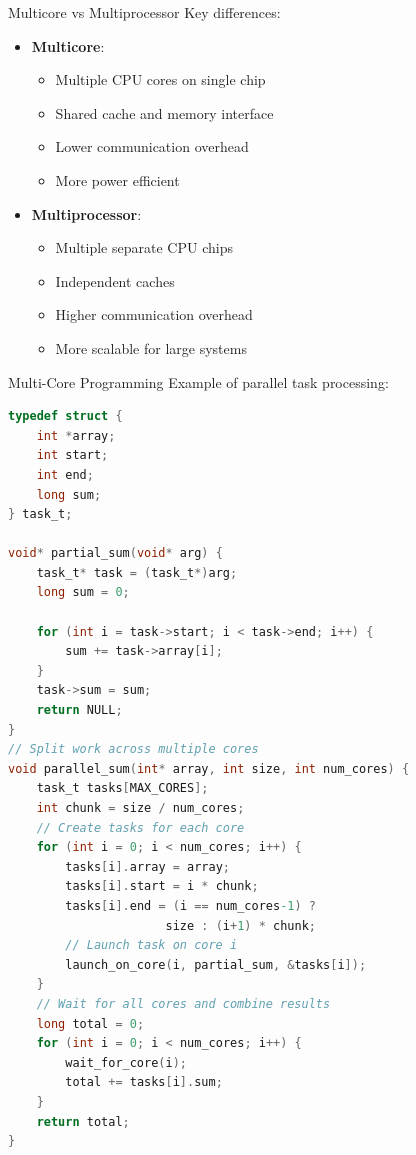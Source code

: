 \begin{example2}{Multicore vs Multiprocessor}
Key differences:
\begin{itemize}
  \item \textbf{Multicore}:
    \begin{itemize}
      \item Multiple CPU cores on single chip
      \item Shared cache and memory interface
      \item Lower communication overhead
      \item More power efficient
    \end{itemize}
  \item \textbf{Multiprocessor}:
    \begin{itemize}
      \item Multiple separate CPU chips
      \item Independent caches
      \item Higher communication overhead
      \item More scalable for large systems
    \end{itemize}
\end{itemize}
\end{example2}

\begin{example2}{Multi-Core Programming}
Example of parallel task processing:

\begin{lstlisting}[language=C, style=basesmol]
typedef struct {
    int *array;
    int start;
    int end;
    long sum;
} task_t;

void* partial_sum(void* arg) {
    task_t* task = (task_t*)arg;
    long sum = 0;
    
    for (int i = task->start; i < task->end; i++) {
        sum += task->array[i];
    }
    task->sum = sum;
    return NULL;
}
// Split work across multiple cores
void parallel_sum(int* array, int size, int num_cores) {
    task_t tasks[MAX_CORES];
    int chunk = size / num_cores;
    // Create tasks for each core
    for (int i = 0; i < num_cores; i++) {
        tasks[i].array = array;
        tasks[i].start = i * chunk;
        tasks[i].end = (i == num_cores-1) ? 
                      size : (i+1) * chunk;
        // Launch task on core i
        launch_on_core(i, partial_sum, &tasks[i]);
    }
    // Wait for all cores and combine results
    long total = 0;
    for (int i = 0; i < num_cores; i++) {
        wait_for_core(i);
        total += tasks[i].sum;
    }
    return total;
}
\end{lstlisting}
\end{example2}


